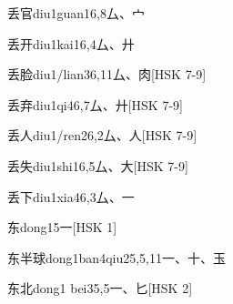 \begin{EntryWithPhonetic}{丢官}{diu1guan1}{6,8}{⼛、⼧}
\end{EntryWithPhonetic}

\begin{EntryWithPhonetic}{丢开}{diu1kai1}{6,4}{⼛、⼶}
\end{EntryWithPhonetic}

\begin{EntryWithPhonetic}{丢脸}{diu1/lian3}{6,11}{⼛、⾁}[HSK 7-9]
\end{EntryWithPhonetic}

\begin{EntryWithPhonetic}{丢弃}{diu1qi4}{6,7}{⼛、⼶}[HSK 7-9]
\end{EntryWithPhonetic}

\begin{EntryWithPhonetic}{丢人}{diu1/ren2}{6,2}{⼛、⼈}[HSK 7-9]
\end{EntryWithPhonetic}

\begin{EntryWithPhonetic}{丢失}{diu1shi1}{6,5}{⼛、⼤}[HSK 7-9]
\end{EntryWithPhonetic}

\begin{EntryWithPhonetic}{丢下}{diu1xia4}{6,3}{⼛、⼀}
\end{EntryWithPhonetic}

\begin{EntryWithPhonetic}{东}{dong1}{5}{⼀}[HSK 1]
\end{EntryWithPhonetic}

\begin{EntryWithPhonetic}{东半球}{dong1ban4qiu2}{5,5,11}{⼀、⼗、⽟}
\end{EntryWithPhonetic}

\begin{EntryWithPhonetic}{东北}{dong1 bei3}{5,5}{⼀、⼔}[HSK 2]
\end{EntryWithPhonetic}

